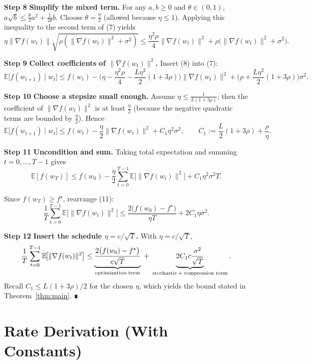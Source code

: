 \documentclass{article}
\newcommand{\EE}{\mathbb{E}}
\begin{document}
\begin{enumerate}
\item[{\bf Step 8}] \textbf{Simplify the mixed term.}  
For any $a,b\ge0$ and $\theta\in(0,1)$,
$a\sqrt{b}\le \frac{\theta}{2}a^2+\frac{1}{2\theta}b$.
Choose $\theta=\frac{\eta}{2}$ (allowed because $\eta\le1$).  Applying this
inequality to the second term of (7) yields
\[
\eta\|\nabla f(w_t)\|\sqrt{\rho(\|\nabla f(w_t)\|^2+\sigma^2)}
\le \frac{\eta^2\rho}{4}\|\nabla f(w_t)\|^2
     +\rho\big(\|\nabla f(w_t)\|^2+\sigma^2\big).\tag{8}
\]

\item[{\bf Step 9}] \textbf{Collect coefficients of $\|\nabla f(w_t)\|^2$.}
Insert (8) into (7):
\[
\EE\!\big[f(w_{t+1})\mid w_t\big]
\le f(w_t)-\Big(\eta-\frac{\eta^2\rho}{4}
-\frac{L\eta^2}{2}(1+3\rho)\Big)\|\nabla f(w_t)\|^2
+\Big(\rho+\frac{L\eta^2}{2}(1+3\rho)\Big)\sigma^2 .\tag{9}
\]

\item[{\bf Step 10}] \textbf{Choose a stepsize small enough.}  
Assume $\eta\le \frac{1}{L(1+3\rho)}$; then the coefficient of $\|\nabla f(w_t)\|^2$
is at least $\frac{\eta}{2}$ (because the negative quadratic terms are bounded
by $\frac{\eta}{2}$).  Hence
\[
\EE\!\big[f(w_{t+1})\mid w_t\big]
\le f(w_t)-\frac{\eta}{2}\|\nabla f(w_t)\|^2
+ C_1\eta^2\sigma^2,\qquad
C_1:=\frac{L}{2}(1+3\rho)+\frac{\rho}{\eta}. \tag{10}
\]

\item[{\bf Step 11}] \textbf{Uncondition and sum.}  
Taking total expectation and summing $t=0,\dots,T-1$ gives
\[
\EE[f(w_T)]\le f(w_0)-\frac{\eta}{2}\sum_{t=0}^{T-1}
\EE\!\big[\|\nabla f(w_t)\|^2\big]
+ C_1\eta^2\sigma^2 T .\tag{11}
\]

Since $f(w_T)\ge f^\star$, rearrange (11):
\[
\frac{1}{T}\sum_{t=0}^{T-1}\EE\!\big[\|\nabla f(w_t)\|^2\big]
\le \frac{2\big(f(w_0)-f^\star\big)}{\eta T}
+2C_1\eta\sigma^2 .\tag{12}
\]

\item[{\bf Step 12}] \textbf{Insert the schedule $\eta=c/\sqrt{T}$.}  
With $\eta=c/\sqrt{T}$,
\[
\frac{1}{T}\sum_{t=0}^{T-1}\EE\!\big[\|\nabla f(w_t)\|^2\big]
\le
\underbrace{\frac{2\big(f(w_0)-f^\star\big)}{c\sqrt{T}}}_{\text{optimization term}}
\;+\;
\underbrace{2C_1c\frac{\sigma^2}{\sqrt{T}}}_{\text{stochastic\,+\;compression term}} .
\]
Recall $C_1\le L(1+3\rho)/2$ for the chosen $\eta$, which yields the bound
stated in Theorem~\ref{thm:main}.  ∎

\section*{Rate Derivation (With Constants)}


\end{enumerate}
\end{document}
